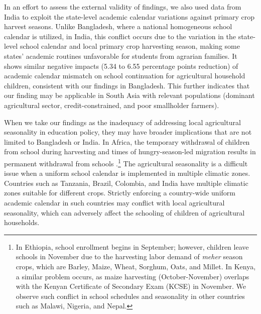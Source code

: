 \documentclass[12pt,letterpaper]{article}\usepackage[margin=1in]{geometry}
\newcommand{\0}{\ensuremath{\mbox{\boldmath $0$}}}
\begin{document}
In an effort to assess the external validity of findings, we also used data from India to exploit the state-level academic calendar variations against primary crop harvest seasons. Unlike Bangladesh, where a national homogeneous school calendar is utilized, in India, this conflict occurs due to the variation in the state-level school calendar and local primary crop harvesting season, making some states' academic routines unfavorable for students from agrarian families. It shows similar negative impacts (5.34 to 6.55 percentage points reduction) of academic calendar mismatch on school continuation for agricultural household children, consistent with our findings in Bangladesh. This further indicates that our finding may be applicable in South Asia with relevant populations (dominant agricultural sector, credit-constrained, and poor smallholder farmers). 

When we take our findings as the inadequacy of addressing local agricultural seasonality in education policy, they may have broader implications that are not limited to Bangladesh or India. In Africa, the temporary withdrawal of children from school during harvesting and times of hungry-season-led migration results in permanent withdrawal from schools \citep{ andvig1999child, Colclough2000, Hadley2010, kadzamira2003can, WorldBank1998}.\footnote{In Ethiopia, school enrollment begins in September; however, children leave schools in November due to the harvesting labor demand of \textit{meher} season crops, which are Barley, Maize, Wheat, Sorghum, Oats, and Millet. In Kenya, a similar problem occurs, as maize harvesting (October-November) overlaps with the Kenyan Certificate of Secondary Exam (KCSE) in November. We observe such conflict in school schedules and seasonality in other countries such as Malawi, Nigeria, and Nepal. } The agricultural seasonality is a difficult issue when a uniform school calendar is implemented in multiple climatic zones. Countries such as Tanzania, Brazil, Colombia, and India have multiple climatic zones suitable for different crops. Strictly enforcing a country-wide uniform academic calendar in such countries may conflict with local agricultural seasonality, which can adversely affect the schooling of children of agricultural households. 
\end{document}
